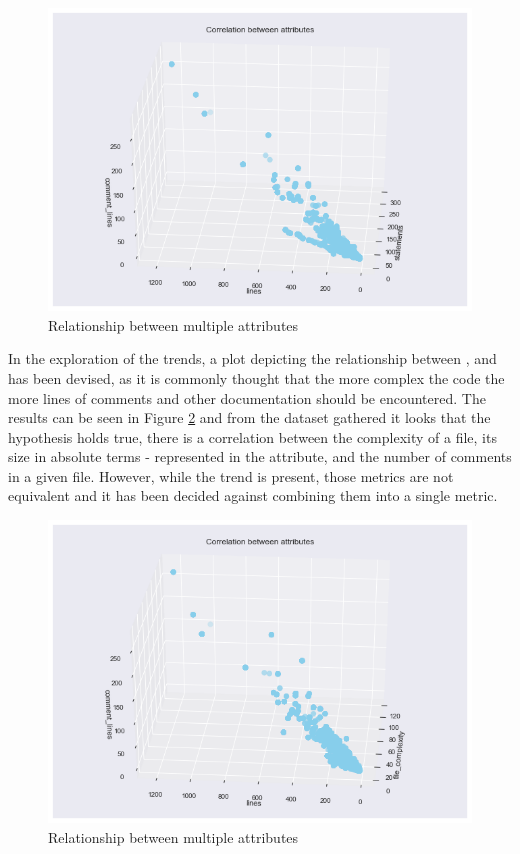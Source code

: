 \begin{enumerate}
\begin{figure}[!h]
    \centering
    \includegraphics[scale=0.65]{Figures/three-d/Correlation-between-attributes-statements-lines-comment_lines.png}
    \caption{Relationship between multiple attributes}
    \label{fig:3d:statements-lines-commentLines}
\end{figure}

In the exploration of the trends, a plot depicting the relationship between \lines{}, \fileComplexity{} and \commentLines{} has been devised, as it is commonly thought that the more complex the code the more lines of comments and other documentation should be encountered. The results can be seen in Figure \ref{fig:3d:fileComplexity-lines-commentLines} and from the dataset gathered it looks that the hypothesis holds true, there is a correlation between the complexity of a file, its size in absolute terms - represented in the \lines{} attribute, and the number of comments in a given file. 
However, while the trend is present, those metrics are not equivalent and it has been decided against combining them into a single metric.
\begin{figure}[!h]
    \centering
    \includegraphics[scale=0.65]{Figures/three-d/Correlation-between-attributes-file_complexity-lines-comment_lines.png}
    \caption{Relationship between multiple attributes}
    \label{fig:3d:fileComplexity-lines-commentLines}
\end{figure}


\end{enumerate}
